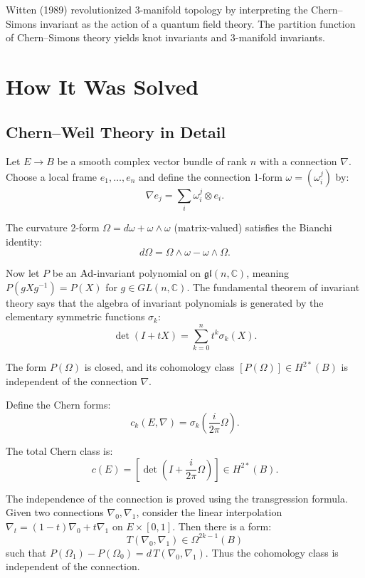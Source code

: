 Witten (1989) revolutionized 3-manifold topology by interpreting the Chern--Simons invariant as the action of a quantum field theory. The partition function of Chern--Simons theory yields knot invariants and 3-manifold invariants.

\section{How It Was Solved}

\subsection{Chern--Weil Theory in Detail}

Let $E \to B$ be a smooth complex vector bundle of rank $n$ with a connection $\nabla$. Choose a local frame $e_1, \ldots, e_n$ and define the connection 1-form $\omega = (\omega_i^j)$ by:
\[
\nabla e_j = \sum_i \omega_i^j \otimes e_i.
\]

The curvature 2-form $\Omega = d\omega + \omega \wedge \omega$ (matrix-valued) satisfies the Bianchi identity:
\[
d\Omega = \Omega \wedge \omega - \omega \wedge \Omega.
\]

Now let $P$ be an $\operatorname{Ad}$-invariant polynomial on $\mathfrak{gl}(n, \mathbb{C})$, meaning $P(gXg^{-1}) = P(X)$ for $g \in GL(n, \mathbb{C})$. The fundamental theorem of invariant theory says that the algebra of invariant polynomials is generated by the elementary symmetric functions $\sigma_k$:
\[
\det(I + tX) = \sum_{k=0}^n t^k \sigma_k(X).
\]

\begin{theorem}
The form $P(\Omega)$ is closed, and its cohomology class $[P(\Omega)] \in H^{2*}(B)$ is independent of the connection $\nabla$.
\end{theorem}

Define the Chern forms:
\[
c_k(E, \nabla) = \sigma_k\left(\frac{i}{2\pi} \Omega\right).
\]

The total Chern class is:
\[
c(E) = \left[ \det\left( I + \frac{i}{2\pi} \Omega \right) \right] \in H^{2*}(B).
\]

The independence of the connection is proved using the transgression formula. Given two connections $\nabla_0, \nabla_1$, consider the linear interpolation $\nabla_t = (1-t)\nabla_0 + t\nabla_1$ on $E \times [0,1]$. Then there is a form:
\[
T(\nabla_0, \nabla_1) \in \Omega^{2k-1}(B)
\]
such that $P(\Omega_1) - P(\Omega_0) = d\,T(\nabla_0, \nabla_1)$. Thus the cohomology class is independent of the connection.

